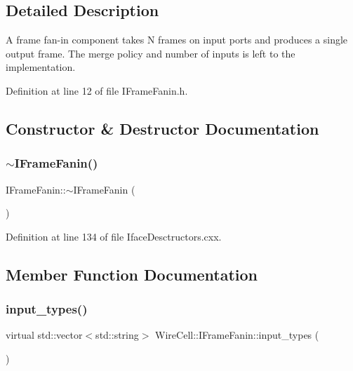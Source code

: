 \subsection{Detailed Description}
A frame fan-\/in component takes N frames on input ports and produces a single output frame. The merge policy and number of inputs is left to the implementation. 

Definition at line 12 of file I\+Frame\+Fanin.\+h.



\subsection{Constructor \& Destructor Documentation}
\mbox{\label{class_wire_cell_1_1_i_frame_fanin_a1b24fd96d0cbe8d8ba2572e751b1f844}} 
\subsubsection{\texorpdfstring{$\sim$\+I\+Frame\+Fanin()}{~IFrameFanin()}}
{\footnotesize\ttfamily I\+Frame\+Fanin\+::$\sim$\+I\+Frame\+Fanin (\begin{DoxyParamCaption}{ }\end{DoxyParamCaption})\hspace{0.3cm}{\ttfamily [virtual]}}



Definition at line 134 of file Iface\+Desctructors.\+cxx.



\subsection{Member Function Documentation}
\mbox{\label{class_wire_cell_1_1_i_frame_fanin_a7c19800cac1dc1bf67199b067811f500}} 
\subsubsection{\texorpdfstring{input\+\_\+types()}{input\_types()}}
{\footnotesize\ttfamily virtual std\+::vector$<$std\+::string$>$ Wire\+Cell\+::\+I\+Frame\+Fanin\+::input\+\_\+types (\begin{DoxyParamCaption}{ }\end{DoxyParamCaption})\hspace{0.3cm}{\ttfamily [pure virtual]}}



